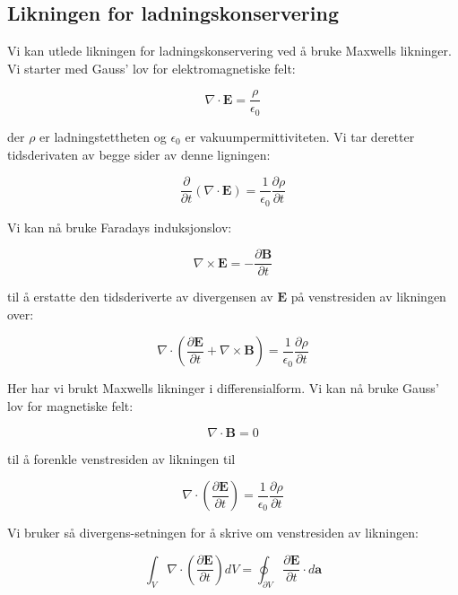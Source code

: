 \subsection*{Likningen for ladningskonservering}
Vi kan utlede likningen for ladningskonservering ved å bruke Maxwells likninger. Vi starter med Gauss' lov for elektromagnetiske felt:

\begin{equation*}
\nabla \cdot \mathbf{E} = \frac{\rho}{\epsilon_0}
\end{equation*}

der $\rho$ er ladningstettheten og $\epsilon_0$ er vakuumpermittiviteten. Vi tar deretter tidsderivaten av begge sider av denne ligningen:

\begin{equation*}
\frac{\partial}{\partial t}(\nabla \cdot \mathbf{E}) = \frac{1}{\epsilon_0}\frac{\partial \rho}{\partial t}
\end{equation*}

Vi kan nå bruke Faradays induksjonslov:

\begin{equation*}
\nabla \times \mathbf{E} = -\frac{\partial \mathbf{B}}{\partial t}
\end{equation*}

til å erstatte den tidsderiverte av divergensen av $\mathbf{E}$ på venstresiden av likningen over:

\begin{equation*}
\nabla \cdot (\frac{\partial \mathbf{E}}{\partial t} + \nabla \times \mathbf{B}) = \frac{1}{\epsilon_0}\frac{\partial \rho}{\partial t}
\end{equation*}

Her har vi brukt Maxwells likninger i differensialform. Vi kan nå bruke Gauss' lov for magnetiske felt:

\begin{equation*}
\nabla \cdot \mathbf{B} = 0
\end{equation*}

til å forenkle venstresiden av likningen til

\begin{equation*}
\nabla \cdot (\frac{\partial \mathbf{E}}{\partial t}) = \frac{1}{\epsilon_0}\frac{\partial \rho}{\partial t}
\end{equation*}

Vi bruker så divergens-setningen for å skrive om venstresiden av likningen:

\begin{equation*}
\int_V \nabla \cdot (\frac{\partial \mathbf{E}}{\partial t}) dV = \oint_{\partial V} \frac{\partial \mathbf{E}}{\partial t} \cdot d\mathbf{a}
\end{equation*}


